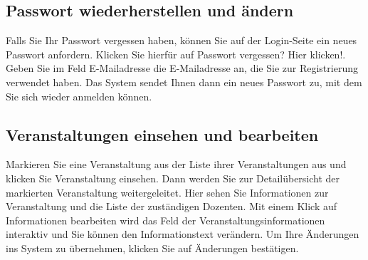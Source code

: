 \documentclass{Handbuch}
\begin{document}
\subsection{Passwort wiederherstellen und ändern}
Falls Sie Ihr Passwort vergessen haben, können Sie auf der Login-Seite ein neues Passwort anfordern. Klicken Sie hierfür auf \frqq Passwort vergessen? Hier klicken!\flqq. Geben Sie im Feld \glqq E-Mailadresse\grqq{} die E-Mailadresse an, die Sie zur Registrierung verwendet haben. Das System sendet Ihnen dann ein neues Passwort zu, mit dem Sie sich wieder anmelden können.

\subsection{Veranstaltungen einsehen und bearbeiten}
Markieren Sie eine Veranstaltung aus der Liste ihrer Veranstaltungen aus und klicken Sie \frqq Veranstaltung einsehen\flqq. Dann werden Sie zur Detailübersicht der markierten Veranstaltung weitergeleitet. Hier sehen Sie Informationen zur Veranstaltung und die Liste der zuständigen Dozenten. Mit einem Klick auf \frqq Informationen bearbeiten\flqq{} wird das Feld der Veranstaltungsinformationen interaktiv und Sie können den Informationstext verändern. Um Ihre Änderungen ins System zu übernehmen, klicken Sie auf \frqq Änderungen bestätigen\flqq.
\end{document}
